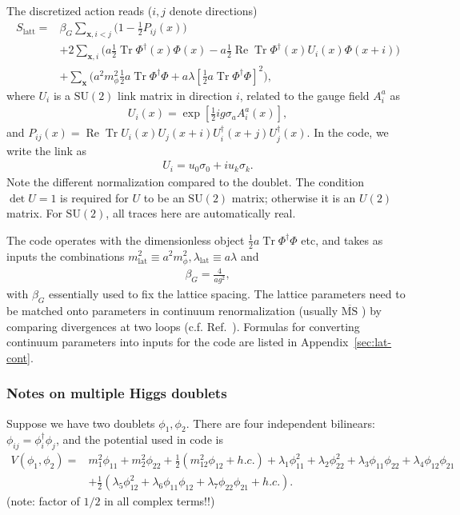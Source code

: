 \documentclass[11pt,a4paper]{article}
\newcommand\RE{\operatorname{Re}}
\newcommand\Tr{\operatorname{Tr}}
\newcommand\MSbar{$\overline{\text{MS}}$ } %
\newcommand\he[1]{#1^\dagger}%
\newcommand\gr[1]{\mathrm{#1}}%
\newcommand\lauri[1]{{\color{myorange}#1}}
\begin{document}
The discretized action reads ($i,j$ denote directions)
\begin{align}
\label{eq:action_higgs}
S_\text{latt} =& \beta_G \sum_{\textbf{x}, i<j} \Big(1-\frac12 P_{ij}(x)\Big) \nonumber \\ 
 &+2 \sum_{\textbf{x},i} \Big( a \frac12  \Tr \he\Phi(x)\Phi(x) - a \frac12 \RE \Tr \he\Phi(x) U_i(x)\Phi(x+i) \Big) \nonumber \\
& + \sum_\textbf{x} \bigg( a^2 m_\phi^2 \frac12 a \Tr \he\Phi\Phi + a \lambda \left[\frac12 a \Tr \he\Phi\Phi\right]^2\bigg),
\end{align}
where $U_i$ is a $\gr{SU(2)}$ link matrix in direction $i$, related to the gauge field $A_i^a$ as 
\begin{align}
U_i(x) = \exp \left[\frac12 i g \sigma_a A_i^a(x) \right], 
\end{align}
and $P_{ij}(x) = \RE \Tr U_i(x) U_j(x+i) \he U_i(x+j) \he U_j(x)$. In the code, we write the link as 
\begin{align}
U_i = u_0 \sigma_0 + i u_k \sigma_k.
\end{align}
Note the different normalization compared to the doublet. The condition $\det U = 1$ is required for $U$ to be an $\gr{SU(2)}$ matrix; otherwise it is an $U(2)$ matrix. For $\gr{SU(2)}$, all traces here are automatically real.

The code operates with the dimensionless object $\frac12 a \Tr \he\Phi\Phi$ etc, and takes as inputs the combinations $m^2_\text{lat} \equiv a^2 m^2_\phi, \lambda_\text{lat} \equiv a \lambda$ and 
\begin{align}
\beta_G = \frac{4}{a g^2},
\end{align}
with $\beta_G$ essentially used to fix the lattice spacing. The lattice parameters need to be matched onto parameters in continuum renormalization (usually \MSbar) by comparing divergences at two loops (c.f. Ref.~\cite{Laine:1995np}). Formulas for converting continuum parameters into inputs for the code are listed in Appendix~\ref{sec:lat-cont}.


\subsubsection{Notes on multiple Higgs doublets}

Suppose we have two doublets $\phi_1, \phi_2$. There are four independent bilinears: $\phi_{ij} = \he\phi_i\phi_j$, and the potential used in code is 
\begin{align}
V(\phi_1, \phi_2) =& m_1^2 \phi_{11} + m_2^2 \phi_{22} + \frac12 (m_{12}^2 \phi_{12} + h.c.) + \lambda_1 \phi_{11}^2 + \lambda_2 \phi_{22}^2 + \lambda_3 \phi_{11}\phi_{22} + \lambda_4 \phi_{12}\phi_{21} \nonumber \\
& + \frac12 (\lambda_5 \phi_{12}^2 + \lambda_6 \phi_{11}\phi_{12} + \lambda_7 \phi_{22}\phi_{21} + h.c.).
\end{align}
\lauri{(note: factor of $1/2$ in all complex terms!!)} 
\end{document}
